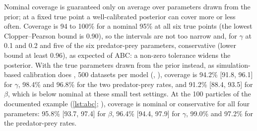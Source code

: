 Nominal coverage is guaranteed only on average over parameters drawn from the prior; at a
fixed true point a well-calibrated posterior can cover more or less often. Coverage is 94 to
100\% for a nominal 95\% at all six true points (the lowest Clopper--Pearson
bound is 0.90), so the intervals are not too narrow and, for $\gamma$ at 0.1 and 0.2 and five of the six
predator-prey parameters, conservative (lower bound at least 0.96), as expected of ABC: a non-zero tolerance widens the posterior. With the true parameters drawn from the prior instead, as
simulation-based calibration does \citep{talts2018validating}, 500 datasets per model (,
), coverage is 94.2\% [91.8, 96.1] for $\gamma$, 98.4\%
and 96.8\% for the two predator-prey rates, and 91.2\% [88.4, 93.5] for $\beta$, which is below nominal at
these small test settings. At the 100 particles of the documented example
(\cref{lst:abc}; ), coverage is nominal or conservative
for all four parameters: 95.8\% [93.7, 97.4] for $\beta$, 96.4\% [94.4, 97.9] for $\gamma$, 99.0\%
and 97.2\% for the predator-prey rates.


